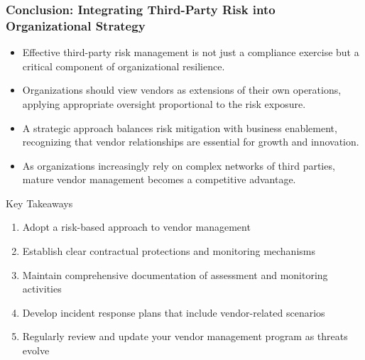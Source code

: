 \documentclass{beamer}
\begin{document}
\begin{frame}
    \frametitle{Conclusion: Integrating Third-Party Risk into Organizational Strategy}
    
    \begin{itemize}
        \item Effective third-party risk management is not just a compliance exercise but a critical component of organizational resilience.
        \item Organizations should view vendors as extensions of their own operations, applying appropriate oversight proportional to the risk exposure.
        \item A strategic approach balances risk mitigation with business enablement, recognizing that vendor relationships are essential for growth and innovation.
        \item As organizations increasingly rely on complex networks of third parties, mature vendor management becomes a competitive advantage.
    \end{itemize}
    
    \begin{alertblock}{Key Takeaways}
        \scriptsize
        \begin{enumerate}
            \item Adopt a risk-based approach to vendor management
            \item Establish clear contractual protections and monitoring mechanisms
            \item Maintain comprehensive documentation of assessment and monitoring activities
            \item Develop incident response plans that include vendor-related scenarios
            \item Regularly review and update your vendor management program as threats evolve
        \end{enumerate}
    \end{alertblock}
\end{frame}
\end{document}
